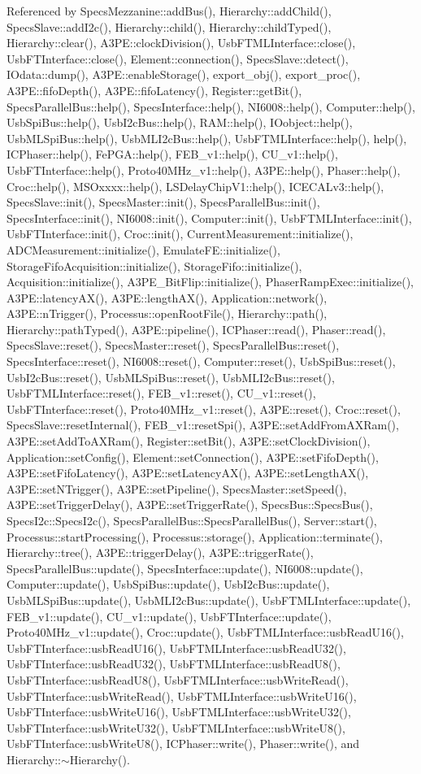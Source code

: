 Referenced by SpecsMezzanine::addBus(), Hierarchy::addChild(), SpecsSlave::addI2c(), Hierarchy::child(), Hierarchy::childTyped(), Hierarchy::clear(), A3PE::clockDivision(), UsbFTMLInterface::close(), UsbFTInterface::close(), Element::connection(), SpecsSlave::detect(), IOdata::dump(), A3PE::enableStorage(), export\_\-obj(), export\_\-proc(), A3PE::fifoDepth(), A3PE::fifoLatency(), Register::getBit(), SpecsParallelBus::help(), SpecsInterface::help(), NI6008::help(), Computer::help(), UsbSpiBus::help(), UsbI2cBus::help(), RAM::help(), IOobject::help(), UsbMLSpiBus::help(), UsbMLI2cBus::help(), UsbFTMLInterface::help(), help(), ICPhaser::help(), FePGA::help(), FEB\_\-v1::help(), CU\_\-v1::help(), UsbFTInterface::help(), Proto40MHz\_\-v1::help(), A3PE::help(), Phaser::help(), Croc::help(), MSOxxxx::help(), LSDelayChipV1::help(), ICECALv3::help(), SpecsSlave::init(), SpecsMaster::init(), SpecsParallelBus::init(), SpecsInterface::init(), NI6008::init(), Computer::init(), UsbFTMLInterface::init(), UsbFTInterface::init(), Croc::init(), CurrentMeasurement::initialize(), ADCMeasurement::initialize(), EmulateFE::initialize(), StorageFifoAcquisition::initialize(), StorageFifo::initialize(), Acquisition::initialize(), A3PE\_\-BitFlip::initialize(), PhaserRampExec::initialize(), A3PE::latencyAX(), A3PE::lengthAX(), Application::network(), A3PE::nTrigger(), Processus::openRootFile(), Hierarchy::path(), Hierarchy::pathTyped(), A3PE::pipeline(), ICPhaser::read(), Phaser::read(), SpecsSlave::reset(), SpecsMaster::reset(), SpecsParallelBus::reset(), SpecsInterface::reset(), NI6008::reset(), Computer::reset(), UsbSpiBus::reset(), UsbI2cBus::reset(), UsbMLSpiBus::reset(), UsbMLI2cBus::reset(), UsbFTMLInterface::reset(), FEB\_\-v1::reset(), CU\_\-v1::reset(), UsbFTInterface::reset(), Proto40MHz\_\-v1::reset(), A3PE::reset(), Croc::reset(), SpecsSlave::resetInternal(), FEB\_\-v1::resetSpi(), A3PE::setAddFromAXRam(), A3PE::setAddToAXRam(), Register::setBit(), A3PE::setClockDivision(), Application::setConfig(), Element::setConnection(), A3PE::setFifoDepth(), A3PE::setFifoLatency(), A3PE::setLatencyAX(), A3PE::setLengthAX(), A3PE::setNTrigger(), A3PE::setPipeline(), SpecsMaster::setSpeed(), A3PE::setTriggerDelay(), A3PE::setTriggerRate(), SpecsBus::SpecsBus(), SpecsI2c::SpecsI2c(), SpecsParallelBus::SpecsParallelBus(), Server::start(), Processus::startProcessing(), Processus::storage(), Application::terminate(), Hierarchy::tree(), A3PE::triggerDelay(), A3PE::triggerRate(), SpecsParallelBus::update(), SpecsInterface::update(), NI6008::update(), Computer::update(), UsbSpiBus::update(), UsbI2cBus::update(), UsbMLSpiBus::update(), UsbMLI2cBus::update(), UsbFTMLInterface::update(), FEB\_\-v1::update(), CU\_\-v1::update(), UsbFTInterface::update(), Proto40MHz\_\-v1::update(), Croc::update(), UsbFTMLInterface::usbReadU16(), UsbFTInterface::usbReadU16(), UsbFTMLInterface::usbReadU32(), UsbFTInterface::usbReadU32(), UsbFTMLInterface::usbReadU8(), UsbFTInterface::usbReadU8(), UsbFTMLInterface::usbWriteRead(), UsbFTInterface::usbWriteRead(), UsbFTMLInterface::usbWriteU16(), UsbFTInterface::usbWriteU16(), UsbFTMLInterface::usbWriteU32(), UsbFTInterface::usbWriteU32(), UsbFTMLInterface::usbWriteU8(), UsbFTInterface::usbWriteU8(), ICPhaser::write(), Phaser::write(), and Hierarchy::$\sim$Hierarchy().


